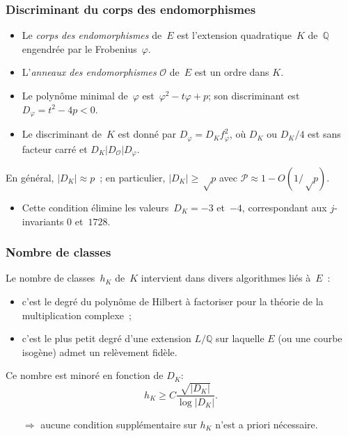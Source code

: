 \documentclass[francais]{beamer}
\newcommand{\abs}[1]{\left| #1 \right|}
\newcommand{\prob}{\mathcal{P}}
\begin{document}
\begin{frame}\frametitle{Discriminant du corps des endomorphismes}
\begin{itemize}
\item Le \emph{corps des endomorphismes} de~$E$ est
l'extension quadratique~$K$ de~$ℚ$ engendrée par le Frobenius~$φ$.
\item L'\emph{anneaux des endomorphismes} $\mathcal{O}$ de~$E$ est un ordre dans $K$.
\item Le polynôme minimal de~$φ$ est~$φ^2 - t φ + p$;
son discriminant est~$D_{φ} = t^2 - 4p < 0$.
\item Le discriminant de~$K$ est donné par $D_{φ} = D_{K} f_{φ}^2$,
où $D_{K}$ ou $D_{K}/4$ est sans facteur carré et $D_K | D_{\mathcal{O}} | D_{φ}$.
\end{itemize}
\begin{block}{}
En général, $\abs{D_K} ≈ p$ ;
en particulier, $\abs{D_{K}} ≥ √p$ avec $\prob ≈ 1-O(1/√p)$.
\end{block}
\begin{itemize}
\item Cette condition élimine les valeurs~$D_{K} = -3$ et~$-4$,
correspondant aux $j$-invariants $0$ et~$1728$.
\end{itemize}
\end{frame}

\begin{frame}\frametitle{Nombre de classes}
Le nombre de classes~$h_K$ de~$K$ intervient dans divers
algorithmes liés à~$E$ :
\begin{itemize}
\item c'est le degré du polynôme de Hilbert à factoriser pour la
théorie de la multiplication complexe ;
\item c'est le plus petit degré d'une extension $L/ℚ$
sur laquelle $E$ (ou une courbe isogène) admet un relèvement fidèle.
\end{itemize}
Ce nombre est minoré en fonction de $D_{K}$:
\[ h_K ≥ C \frac{\sqrt{\abs{D_K}}}{\log \abs{D_K}}. \]
\begin{itemize}
\item[$⇒$] aucune condition supplémentaire sur $h_K$ n'est a priori
nécessaire.
\end{itemize}
\end{frame}
\end{document}

